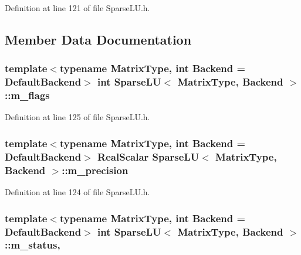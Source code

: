 Definition at line 121 of file Sparse\-L\-U.\-h.



\subsection{Member Data Documentation}
\hypertarget{class_sparse_l_u_ad88d522e5b2a4f6d29b01553b6a54674}{
\subsubsection[{m\-\_\-flags}]{\setlength{\rightskip}{0pt plus 5cm}template$<$typename Matrix\-Type, int Backend = Default\-Backend$>$ {\bf int} {\bf Sparse\-L\-U}$<$ Matrix\-Type, Backend $>$\-::m\-\_\-flags\hspace{0.3cm}{\ttfamily [protected]}}}\label{class_sparse_l_u_ad88d522e5b2a4f6d29b01553b6a54674}


Definition at line 125 of file Sparse\-L\-U.\-h.

\hypertarget{class_sparse_l_u_a489d44afaeb03a937be210f2356cfc8c}{
\subsubsection[{m\-\_\-precision}]{\setlength{\rightskip}{0pt plus 5cm}template$<$typename Matrix\-Type, int Backend = Default\-Backend$>$ {\bf Real\-Scalar} {\bf Sparse\-L\-U}$<$ Matrix\-Type, Backend $>$\-::m\-\_\-precision\hspace{0.3cm}{\ttfamily [protected]}}}\label{class_sparse_l_u_a489d44afaeb03a937be210f2356cfc8c}


Definition at line 124 of file Sparse\-L\-U.\-h.

\hypertarget{class_sparse_l_u_a4c892188136935ccaba41d1f60688e30}{
\subsubsection[{m\-\_\-status}]{\setlength{\rightskip}{0pt plus 5cm}template$<$typename Matrix\-Type, int Backend = Default\-Backend$>$ {\bf int} {\bf Sparse\-L\-U}$<$ Matrix\-Type, Backend $>$\-::m\-\_\-status\hspace{0.3cm}{\ttfamily [mutable]}, {\ttfamily [protected]}}}\label{class_sparse_l_u_a4c892188136935ccaba41d1f60688e30}


